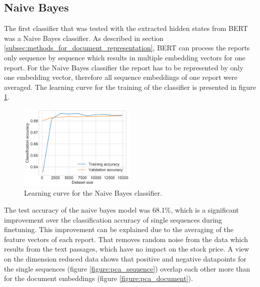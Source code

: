 \subsection{Naive Bayes}
\label{subsec:nb_results}
The first classifier that was tested with the extracted hidden states from \ac{BERT} was a Naive Bayes classifier.
As described in section \ref{subsec:methods_for_document_representation}, \ac{BERT} can process the reports only sequence by sequence which results in multiple embedding vectors for one report.
For the Naive Bayes classifier the report has to be represented by only one embedding vector, therefore all sequence embeddings of one report were averaged.
The learning curve for the training of the classifier is presented in figure \ref{figure:nb_learning}.
\begin{figure}[h]
    \centering
    \includegraphics[width=0.5\textwidth]{figures/charts/nb_learning.png}
    \caption{Learning curve for the Naive Bayes classifier.}
    \label{figure:nb_learning}
\end{figure}
The test accuracy of the naive bayes model was 68.1\%, which is a significant improvement over the classification accuracy of single sequences during finetuning.
This improvement can be explained due to the averaging of the feature vectors of each report.
That removes random noise from the data which results from the text passages, which have no impact on the stock price.
A view on the dimension reduced data shows that positive and negative datapoints for the single sequences (figure \ref{figure:pca_sequence}) overlap each other more than for the document embeddings (figure \ref{figure:pca_document}).
